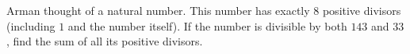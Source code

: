 Arman thought of a natural number. This number has exactly $8$ positive divisors (including $1$ and the number itself). If the number is divisible by both $143$ and $33$, find the sum of all its positive divisors.
